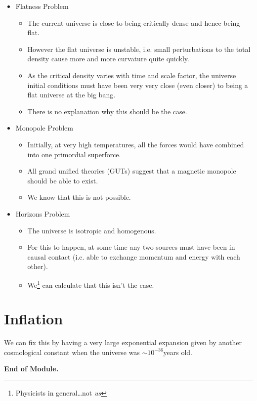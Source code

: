 \begin{itemize}
    \item Flatness Problem
    \begin{itemize}
        \item The current universe is close to being critically dense and hence being flat.
        \item However the flat universe is unstable, i.e. small perturbations to the total density cause more and more curvature quite quickly.
        \item As the critical density varies with time and scale factor, the universe initial conditions must have been very very close (even closer) to being a flat universe at the big bang.
        \item There is no explanation why this should be the case.
    \end{itemize}
    \item Monopole Problem
    \begin{itemize}
        \item Initially, at very high temperatures, all the forces would have combined into one primordial superforce. 
        \item All grand unified theories (GUTs) suggest that a magnetic monopole should be able to exist.
        \item We know that this is not possible.
    \end{itemize}
    \item Horizons Problem
    \begin{itemize}
        \item The universe is isotropic and homogenous.
        \item For this to happen, at some time any two sources must have been in causal contact (i.e. able to exchange momentum and energy with each other).
        \item We\footnote{Physicists in general\dots not \emph{us}} can calculate that this isn't the case.
    \end{itemize}
\end{itemize}

\section{Inflation}
We can fix this by having a very large exponential expansion given by another cosmological constant when the universe was $\sim 10^{-36}$years old.

\vspace{1cm}
\begin{center}
    \large \textbf{End of Module.}
\end{center}


 

